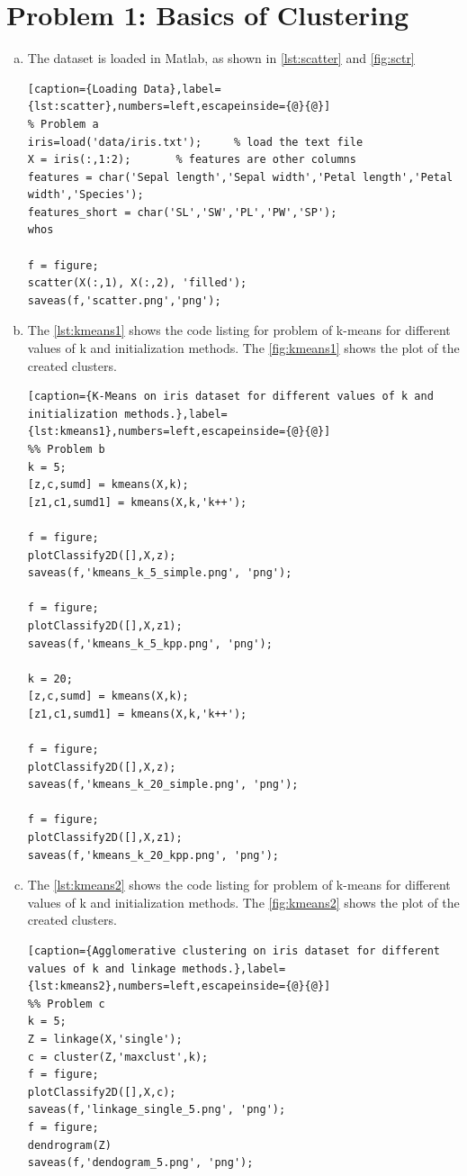 \documentclass[a4paper, 11pt]{article}
\begin{document}
\section*{Problem 1: Basics of Clustering}
\begin{enumerate}[(a)]
\item The dataset is loaded in Matlab, as shown in \autoref{lst:scatter} and \autoref{fig:sctr}
\vspace{-20pt}
\begin{lstlisting}[caption={Loading Data},label={lst:scatter},numbers=left,escapeinside={@}{@}]
% Problem a
iris=load('data/iris.txt');     % load the text file
X = iris(:,1:2);       % features are other columns
features = char('Sepal length','Sepal width','Petal length','Petal width','Species');
features_short = char('SL','SW','PL','PW','SP');
whos

f = figure;
scatter(X(:,1), X(:,2), 'filled');
saveas(f,'scatter.png','png');
\end{lstlisting}
\item The \autoref{lst:kmeans1} shows the code listing for problem of k-means for different values of k and initialization methods. The \autoref{fig:kmeans1} shows the plot of the created clusters.
\vspace{-20pt}
\begin{lstlisting}[caption={K-Means on iris dataset for different values of k and initialization methods.},label={lst:kmeans1},numbers=left,escapeinside={@}{@}]
%% Problem b
k = 5;
[z,c,sumd] = kmeans(X,k);
[z1,c1,sumd1] = kmeans(X,k,'k++');

f = figure;
plotClassify2D([],X,z);
saveas(f,'kmeans_k_5_simple.png', 'png');

f = figure;
plotClassify2D([],X,z1);
saveas(f,'kmeans_k_5_kpp.png', 'png');

k = 20;
[z,c,sumd] = kmeans(X,k);
[z1,c1,sumd1] = kmeans(X,k,'k++');

f = figure;
plotClassify2D([],X,z);
saveas(f,'kmeans_k_20_simple.png', 'png');

f = figure;
plotClassify2D([],X,z1);
saveas(f,'kmeans_k_20_kpp.png', 'png');
\end{lstlisting}

\item The \autoref{lst:kmeans2} shows the code listing for problem of k-means for different values of k and initialization methods. The \autoref{fig:kmeans2} shows the plot of the created clusters.
\vspace{-20pt}
\begin{lstlisting}[caption={Agglomerative clustering on iris dataset for different values of k and linkage methods.},label={lst:kmeans2},numbers=left,escapeinside={@}{@}]
%% Problem c
k = 5;
Z = linkage(X,'single');
c = cluster(Z,'maxclust',k);
f = figure;
plotClassify2D([],X,c);
saveas(f,'linkage_single_5.png', 'png');
f = figure;
dendrogram(Z)
saveas(f,'dendogram_5.png', 'png');


\end{lstlisting}
\end{enumerate}
\end{document}
